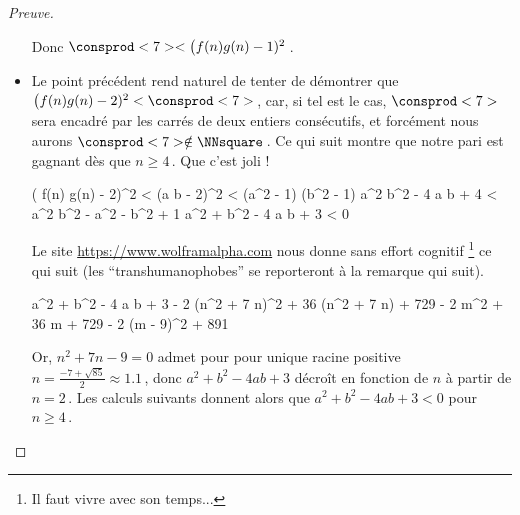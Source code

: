 \begin{proof}[Preuve]
\begin{itemize}
        \medskip
        
        \noindent
        Donc $\consprod<7> < \big( f(n) g(n) - 1)^2$\,.


		\item Le point précédent rend naturel de tenter de démontrer que 
		$\big( f(n) g(n) - 2)^2 < \consprod<7>$\,, car, si tel est le cas, 
		$\consprod<7>$ sera encadré par les carrés de deux entiers consécutifs, et forcément nous aurons $\consprod<7> \notin \NNsquare$\,. 
		Ce qui suit montre que notre pari est gagnant dès que $n \geq 4$\,. Que c'est joli !

        \medskip
        \noindent\kern-6pt%
        \begin{stepcalc}[style = ar*, ope={\iff}]
        	\big( f(n) g(n) - 2)^2 < \consprod<7>
        	(a b - 2)^2 < (a^2 - 1) (b^2 - 1)
        \explnext{}
        	a^2 b^2 - 4 a b + 4 < a^2 b^2 - a^2 - b^2 + 1
        \explnext{}
        	a^2 + b^2 - 4 a b + 3 < 0
        \end{stepcalc}

        \medskip
        \noindent
        Le site \url{https://www.wolframalpha.com} nous donne sans effort cognitif
        \footnote{
        	Il faut vivre avec son temps...
        }
        ce qui suit (les \enquote{transhumanophobes} se reporteront à la remarque qui suit).

        \medskip
        \noindent\kern-6pt%
        \begin{stepcalc}[style = ar*, ope={=}]
        	a^2 + b^2 - 4 a b + 3
        \explnext{}
        	- 2 (n^2 + 7 n)^2 + 36 (n^2 + 7 n) + 729
        	- 2 m^2 + 36 m + 729
        \explnext{}
        	- 2 (m - 9)^2 + 891
        \end{stepcalc}
        
        \medskip
        
        \noindent
        Or, $n^2 + 7 n - 9 = 0$ admet pour pour unique racine positive $n = \frac{- 7 + \sqrt{85}}{2} \approx \num{1.1}$\,,
        donc $a^2 + b^2 - 4 a b + 3$ décroît en fonction de $n$ à partir de $n = 2$\,. Les calculs suivants donnent alors que $a^2 + b^2 - 4 a b + 3 < 0$ pour $n \geq 4$\,.
	\end{itemize}

	\begin{center}
	\end{center}


\end{proof}
